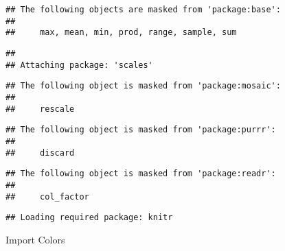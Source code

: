 \documentclass[
]{article}
\begin{document}
\begin{verbatim}
## The following objects are masked from 'package:base':
## 
##     max, mean, min, prod, range, sample, sum
\end{verbatim}

\begin{verbatim}
## 
## Attaching package: 'scales'
\end{verbatim}

\begin{verbatim}
## The following object is masked from 'package:mosaic':
## 
##     rescale
\end{verbatim}

\begin{verbatim}
## The following object is masked from 'package:purrr':
## 
##     discard
\end{verbatim}

\begin{verbatim}
## The following object is masked from 'package:readr':
## 
##     col_factor
\end{verbatim}

\begin{verbatim}
## Loading required package: knitr
\end{verbatim}

Import Colors
\end{document}
